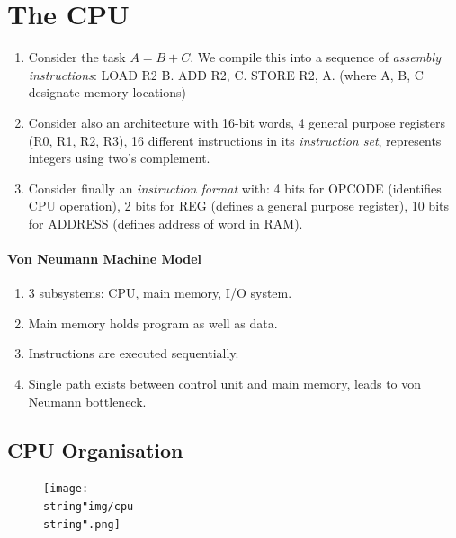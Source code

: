 \documentclass[twocolumn,english]{article}
\begin{document}
\section{The CPU}
\begin{enumerate}
\item Consider the task $A=B+C$. We compile this into a sequence of \emph{assembly
instructions}: LOAD R2 B. ADD R2, C. STORE R2, A. (where A, B, C designate
memory locations)
\item Consider also an architecture with 16-bit words, 4 general purpose
registers (R0, R1, R2, R3), 16 different instructions in its \emph{instruction
set}, represents integers using two's complement.
\item Consider finally an \emph{instruction format} with: 4 bits for OPCODE
(identifies CPU operation), 2 bits for REG (defines a general purpose
register), 10 bits for ADDRESS (defines address of word in RAM).
\end{enumerate}

\paragraph{Von Neumann Machine Model}
\begin{enumerate}
\item 3 subsystems: CPU, main memory, I/O system.
\item Main memory holds program as well as data.
\item Instructions are executed sequentially.
\item Single path exists between control unit and main memory, leads to
von Neumann bottleneck.
\end{enumerate}

\subsection{CPU Organisation}

\begin{figure}[H]
\noindent \centering{}\texttt{[image: \\string"img/cpu\\string".png]}
\end{figure}
\end{document}

